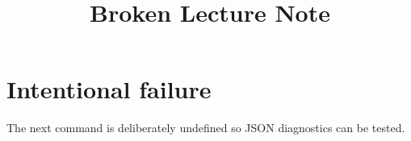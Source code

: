 \documentclass{article}
\title{Broken Lecture Note}
\begin{document}
\maketitle


\section{Intentional failure}
The next command is deliberately undefined so JSON diagnostics can be tested.
\undefinedcommand
\end{document}
